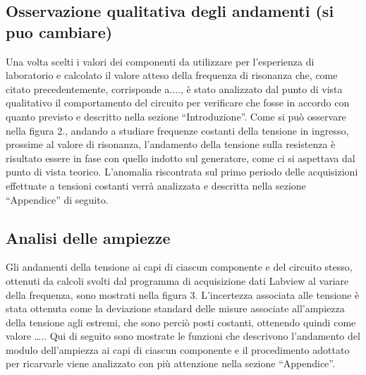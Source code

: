 \subsection{Osservazione qualitativa degli andamenti (si puo cambiare)}

Una volta scelti i valori dei componenti da utilizzare per l’esperienza di laboratorio e calcolato il valore atteso della frequenza di risonanza che, come citato precedentemente, corrisponde a...., è stato analizzato dal punto di vista qualitativo il comportamento del circuito per verificare che fosse in accordo con quanto previsto e descritto nella sezione “Introduzione”.
Come si può osservare nella figura 2., andando a studiare frequenze costanti della tensione in ingresso, prossime al valore di risonanza, l’andamento della tensione sulla resistenza è risultato essere in fase con quello indotto sul generatore, come ci si aspettava dal punto di vista teorico.
L’anomalia riscontrata sul primo periodo delle acquisizioni effettuate a tensioni costanti verrà analizzata e descritta nella sezione “Appendice” di seguito.

\subsection{Analisi delle ampiezze}

Gli andamenti della tensione ai capi di ciascun componente e del circuito stesso, ottenuti da calcoli svolti dal programma di acquisizione dati Labview al variare della frequenza, sono mostrati nella figura 3.
L’incertezza associata alle tensione è stata ottenuta come la deviazione standard delle misure associate all’ampiezza della tensione agli estremi, che sono perciò posti costanti, ottenendo quindi come valore …..
Qui di seguito sono mostrate le funzioni che descrivono l’andamento del modulo dell’ampiezza ai capi di ciascun componente e il procedimento adottato per ricarvarle viene analizzato con più attenzione nella sezione “Appendice”.










